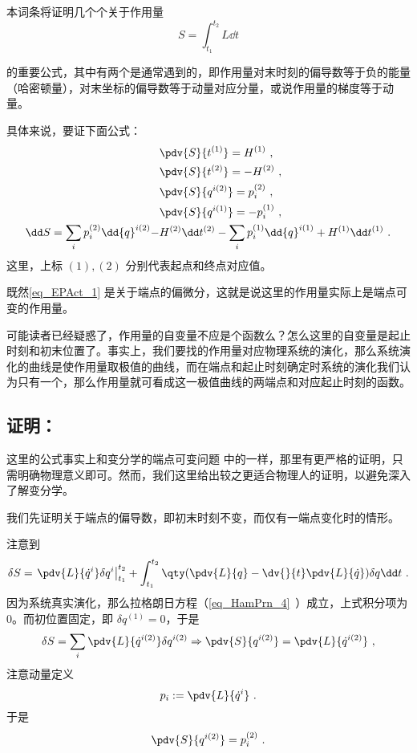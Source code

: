 
本词条将证明几个个关于作用量
\begin{equation}
S=\int_{t_1}^{t_2}L\dd t
\end{equation}

的重要公式，其中有两个是通常遇到的，即作用量对末时刻的偏导数等于负的能量（哈密顿量），对末坐标的偏导数等于动量对应分量，或说作用量的梯度等于动量。

具体来说，要证下面公式：
\begin{equation}\label{eq_EPAct_1}
\begin{aligned}
&\pdv{S}{t^{(1)}}=H^{(1)}~,\\
&\pdv{S}{t^{(2)}}=-H^{(2)}~,\\
&\pdv{S}{{q}^{i(2)}}=p_i^{(2)}~,\\
&\pdv{S}{{q}^{i (1)}}=-p_i^{(1)}~,\\
\dd S=\sum_i p_i^{(2)}\dd {q}^{i (2)}-&H^{(2)}\dd t^{(2)}-\sum_i p_i^{(1)}\dd {q}^{i (1)}+H^{(1)}\dd t^{(1)}~.
\end{aligned}
\end{equation}
这里，上标 $(1),(2)$ 分别代表起点和终点对应值。

既然\autoref{eq_EPAct_1} 是关于端点的偏微分，这就是说这里的作用量实际上是端点可变的作用量。

可能读者已经疑惑了，作用量的自变量不应是个函数么？怎么这里的自变量是起止时刻和初末位置了。事实上，我们要找的作用量对应物理系统的演化，那么系统演化的曲线是使作用量取极值的曲线，而在端点和起止时刻确定时系统的演化我们认为只有一个，那么作用量就可看成这一极值曲线的两端点和对应起止时刻的函数。
\subsection{证明：}
这里的公式事实上和变分学的端点可变问题 中的一样，那里有更严格的证明，只需明确物理意义即可。然而，我们这里给出较之更适合物理人的证明，以避免深入了解变分学。

我们先证明关于端点的偏导数，即初末时刻不变，而仅有一端点变化时的情形。

注意到
\begin{equation}
\delta S=\left.\pdv{L}{\dot q^i}\delta q^i\right|_{t_1}^{t_2}+\int_{t_1}^{t_2}\qty(\pdv{L}{q}-\dv{}{t}\pdv{L}{\dot q})\delta q\dd t~.
\end{equation}
因为系统真实演化，那么拉格朗日方程（\autoref{eq_HamPrn_4}~）成立，上式积分项为0。而初位置固定，即 $\delta q^{(1)}=0$，于是
\begin{equation}
\delta S=\sum_i\pdv{L}{{\dot q}^{i (2)}}\delta {q}^{i (2)}\Rightarrow \pdv{S}{{q}^{i (2)}}=\pdv{L}{{\dot q}^{i (2)}}~,
\end{equation}
注意动量定义
\begin{equation}
p_i:=\pdv{L}{\dot q^i}~.
\end{equation}
于是
\begin{equation}
\pdv{S}{{q}^{i (2)}}=p_i^{(2)}~.
\end{equation}

